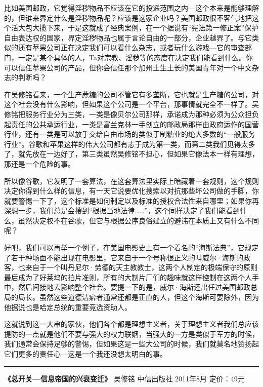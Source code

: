 比如美国邮政，它觉得淫秽物品不应该在它的投递范围之内---这个本来是能够理解的，但谁来界定什么是淫秽物品呢？应该是这家企业吗？美国邮政很不客气地把这个活大包大揽下来，于是这就成了经典案例，在一个据说有``宪法第一修正案''保护自由表达权的国家，界定淫秽物品也属于言论自由的一部分，企业越界了。与它类似的还有苹果公司正在决定我们可以看什么杂志，或者玩什么游戏---它的审查部门，一定是某个具体的人，Ta对宗教、淫秽等的态度在决定我们能看到什么。你可以信任苹果公司的产品，但你会信任那个加州土生土长的美国青年对一个中文杂志的判断吗？

在吴修铭看来，一个生产蔗糖的公司不管它有多垄断，它也就是生产糖的公司，对这个社会没有什么影响，但如果这个公司是一个平台，那事情就完全不一样了。吴修铭把服务行业分为三类，一类是像贝尔公司那样，承诺成为那种必须为公众担负起责任的公共承运行业，一类是富兰克林一手创立的邮政局那样由政府运作的国营行业，还有一类是可以放手交给自由市场的类似于制糖业的绝大多数的``一般服务行业''。谷歌和苹果这样的伟大公司都有志于成为第一类，而第二类我们见得太多了，就先放在一边好了，第三类虽然吴修铭不担心，但如果它像法本一样有理想，那还是一个危险的事。

所以像谷歌，它发明了一套算法，在这套算法里实际上暗藏着一套规则，这个规则决定你得到什么样的信息，有一天它说要优化搜索以对抗那些坏公司做的手脚，你就要警惕一下了，这个标准是如何制定以及标准的授权合法性来自哪里；如果你再深想一步，我们总是会搜到``根据当地法律\ldots{}\ldots{}''，这个同样决定了我们能看到什么，虽然决定权不在谷歌，但它与根据公序良俗建立的避讳在本质上又有什么不同呢？

好吧，我们可以再举一个例子，在美国电影史上有一个着名的``海斯法典''，它规定了若干种场面不能出现在电影里，它来自于一个号称很正义的叫威尔·海斯的政客，也来自于一个叫丹尼尔·劳德的天主教教士，这两个人制定的极端保守的原则最后成为了好莱坞的拍片准则，所有的大制片厂们的趣味就这样控制在这两个人手中，然后间接地去影响整个社会。要提一下的是，威尔·海斯还出任过美国邮政总局的局长。虽然这些道德洁癖者通常还都是正直的人，但这个海斯可要除外，因为他据说也是哈定总统的重要竞选资助人。

这就说到这一大串的家伙，他们各个都是理想主义者，关于理想主义者我们总应该提防的一点就是他们不要与强大的权力联姻，当强大的一方是类似于军方的时候，我们通常会保持足够的警惕，但如果这是一些大公司的时候，我们就莫名地赞扬起它们更多的责任心---这是一个我还没想太明白的事。

\begin{center}\rule{3in}{0.4pt}\end{center}

\textbf{《总开关---信息帝国的兴衰变迁》} 吴修铭 中信出版社 2011年8月
定价：49元

